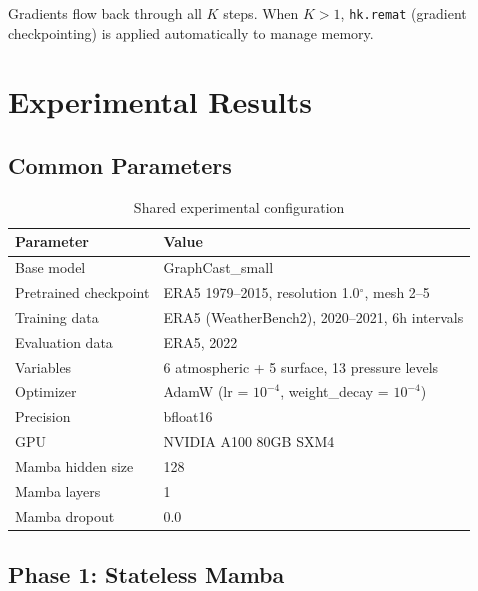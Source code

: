 \documentclass[11pt,a4paper]{article}
\begin{document}
Gradients flow back through all $K$ steps. When $K > 1$, \texttt{hk.remat} (gradient checkpointing) is applied automatically to manage memory.

\section{Experimental Results}

\subsection{Common Parameters}

\begin{table}[H]
\centering
\caption{Shared experimental configuration}
\begin{tabular}{ll}
\toprule
Parameter & Value \\
\midrule
Base model & GraphCast\_small \\
Pretrained checkpoint & ERA5 1979--2015, resolution 1.0$^\circ$, mesh 2--5 \\
Training data & ERA5 (WeatherBench2), 2020--2021, 6h intervals \\
Evaluation data & ERA5, 2022 \\
Variables & 6 atmospheric + 5 surface, 13 pressure levels \\
Optimizer & AdamW (lr = $10^{-4}$, weight\_decay = $10^{-4}$) \\
Precision & bfloat16 \\
GPU & NVIDIA A100 80GB SXM4 \\
\midrule
Mamba hidden size & 128 \\
Mamba layers & 1 \\
Mamba dropout & 0.0 \\
\bottomrule
\end{tabular}
\end{table}

\subsection{Phase 1: Stateless Mamba}
\end{document}
